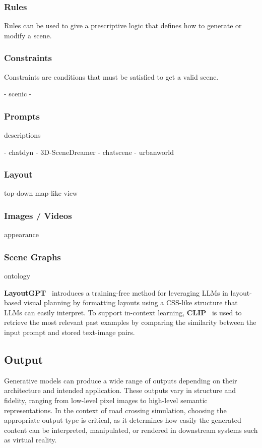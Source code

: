 \documentclass{article}
\begin{document}
\subsubsection{Rules}

Rules can be used to give a prescriptive logic that defines how to generate or modify a scene. 

\subsubsection{Constraints}

Constraints are conditions that must be satisfied to get a valid scene.

- scenic
- 

\subsubsection{Prompts}
descriptions

- chatdyn
- 3D-SceneDreamer
- chatscene
- urbanworld

\subsubsection{Layout}
top-down map-like view

\subsubsection{Images / Videos}
appearance

\subsubsection{Scene Graphs}
ontology


\textbf{LayoutGPT}~\cite{feng2023layoutgpt} introduces a training-free method for leveraging LLMs in layout-based visual planning by formatting layouts using a CSS-like structure that LLMs can easily interpret. To support in-context learning, \textbf{CLIP}~\cite{radford2021learning} is used to retrieve the most relevant past examples by comparing the similarity between the input prompt and stored text-image pairs.

\subsection{Output}

Generative models can produce a wide range of outputs depending on their architecture and intended application. These outputs vary in structure and fidelity, ranging from low-level pixel images to high-level semantic representations. In the context of road crossing simulation, choosing the appropriate output type is critical, as it determines how easily the generated content can be interpreted, manipulated, or rendered in downstream systems such as virtual reality.
\end{document}
